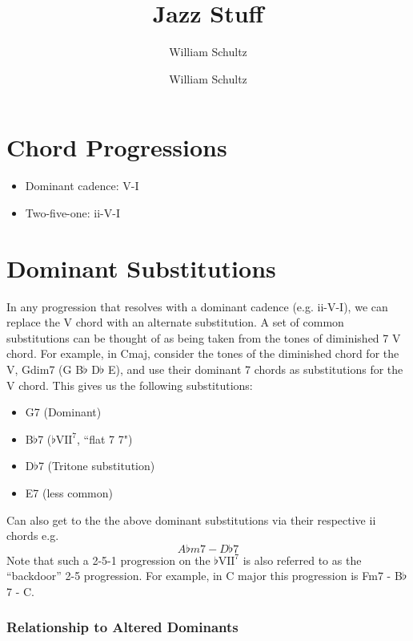 \documentclass[10pt,a4paper]{article}
\author{William Schultz}
\begin{document}
\title{Jazz Stuff}
\author{William Schultz}
\maketitle

\section{Chord Progressions}
\begin{itemize}
    \item Dominant cadence: V-I
    \item Two-five-one: ii-V-I
\end{itemize}

\section{Dominant Substitutions}

In any progression that resolves with a dominant cadence (e.g. ii-V-I), we can replace the V chord with an alternate substitution. A set of common substitutions can be thought of as being taken from the tones of diminished 7 V chord. For example, in Cmaj, consider the tones of the diminished chord for the V, Gdim7 (G B$\flat$ D$\flat$ E), and use their dominant 7 chords as substitutions for the V chord. This gives us the following substitutions: 
\begin{itemize}
    \item G7 (Dominant)
    \item B$\flat$7 ($\flat\text{VII}^7$, ``flat 7 7")
    \item D$\flat$7 (Tritone substitution)
    \item E7 (less common)
\end{itemize}
Can also get to the the above dominant substitutions via their respective ii chords e.g. $$A \flat m7 - D \flat 7$$ Note that such a 2-5-1 progression on the $\flat\text{VII}^7$ is also referred to as the ``backdoor'' 2-5 progression. For example, in C major this progression is Fm7 - B$\flat$7 - C.

\subsubsection*{Relationship to Altered Dominants}
\end{document}
